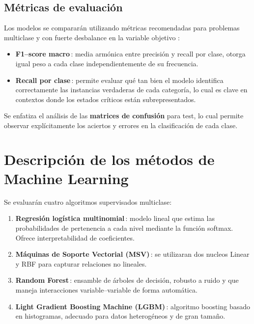\documentclass[
  11pt,
  pdftitle=TFI - Tschopp Joaquín S.,
  pdfauthor=Tschopp Joaquín S.,
  pdfcreator=LaTeX with hyperref,
]{report}  %
\begin{document}
\subsection{Métricas de evaluación}
Los modelos se compararán utilizando métricas recomendadas para problemas
multiclase y con fuerte desbalance en la variable objetivo \citep{Powers2011}:

\begin{itemize}[noitemsep]
  \item \textbf{F1–score macro}\,: media armónica entre precisión y recall por clase, otorga igual peso a cada clase independientemente de su frecuencia.
  \item \textbf{Recall por clase}\,: permite evaluar qué tan bien el modelo identifica correctamente las instancias verdaderas de cada categoría, lo cual es clave en contextos donde los estados críticos están subrepresentados.
\end{itemize}

Se enfatiza el análisis de las \textbf{matrices de confusión} para test, lo cual permite observar explícitamente los aciertos y errores en la clasificación de cada clase.



\section{Descripción de los métodos de Machine Learning}

Se evaluarán cuatro algoritmos supervisados multiclase:

\begin{enumerate}[noitemsep]
\item \textbf{Regresión logística multinomial}\,: modelo lineal que
      estima las probabilidades de pertenencia a cada nivel mediante
      la función softmax. Ofrece interpretabilidad de
      coeficientes.
\item \textbf{Máquinas de Soporte Vectorial (MSV)}\,: se utilizaran dos nucleos Linear y RBF para capturar relaciones no lineales.
\item \textbf{Random Forest}\,: ensamble de árboles de decisión, robusto a ruido y que maneja interacciones
      variable–variable de forma automática.
\item \textbf{Light Gradient Boosting Machine (LGBM)}\,: algoritmo
      boosting basado en histogramas, adecuado para datos heterogéneos y de gran tamaño.
\end{enumerate}
\end{document}
